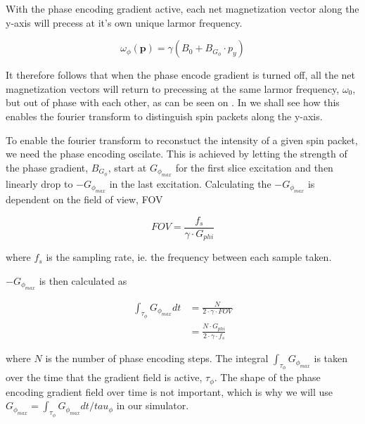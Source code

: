 With the phase encoding gradient active, each net magnetization vector
along the y-axis will precess at it's own unique larmor frequency. 

\begin{displaymath}
  \omega_\phi(\mathbf{p}) = \gamma (B_0 + B_{G_\phi} \cdot p_y)
\end{displaymath}

It therefore follows that when the phase encode gradient is turned
off, all the net magnetization vectors will return to precessing at
the same larmor frequency, $\omega_0$, but out of phase with each
other, as can be seen on . In
 we shall see how this enables the fourier
transform to distinguish spin packets along the y-axis.

To enable the fourier transform to reconstuct the intensity of a given
spin packet, we need the phase encoding oscilate. This is achieved by
letting the strength of the phase gradient, $B_{G_\phi}$, start at
$G_{\phi_{max}}$ for the first slice excitation and then linearly drop
to $-G_{\phi_{max}}$ in the last excitation. Calculating the
$-G_{\phi_{max}}$ is dependent on the field of view, FOV

\begin{displaymath}
  FOV = \frac{f_s}{\gamma \cdot G_{phi}}
\end{displaymath}

where $f_s$ is the sampling rate, ie. the frequency between each
sample taken.

$-G_{\phi_{max}}$ is then calculated as

\begin{displaymath}
  \begin{array}{rl}
    \int_{\tau_\phi} G_{\phi_{max}} dt &= \frac{N}{2 \cdot \gamma \cdot FOV}\\
    &= \frac{N \cdot G_{phi}}{2 \cdot \gamma \cdot f_s}
  \end{array}
\end{displaymath}

where $N$ is the number of phase encoding steps. The integral
$\int_{\tau_\phi} G_{\phi_{max}}$ is taken over the time that the
gradient field is active, $\tau_\phi$. The shape of the phase encoding
gradient field over time is not important, which is why we will use
$G_{\phi_{max}} = \int_{\tau_\phi} G_{\phi_{max}} dt / tau_\phi$ in our
simulator.




